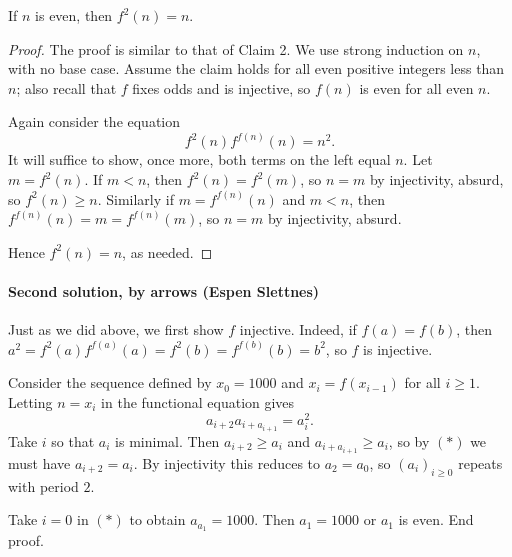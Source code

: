 \begin{claim}
    If $n$ is even, then $f^2(n)=n$.
\end{claim}
\begin{proof}
    The proof is similar to that of Claim 2. We use strong induction on $n$, with no base case. Assume the claim holds for all even positive integers less than $n$; also recall that $f$ fixes odds and is injective, so $f(n)$ is even for all even $n$.

    Again consider the equation \[f^2(n)f^{f(n)}(n)=n^2.\]
    It will suffice to show, once more, both terms on the left equal $n$. Let $m=f^2(n)$. If $m<n$, then $f^2(n)=f^2(m)$, so $n=m$ by injectivity, absurd, so $f^2(n)\ge n$. Similarly if $m=f^{f(n)}(n)$ and $m<n$, then $f^{f(n)}(n)=m=f^{f(n)}(m)$, so $n=m$ by injectivity, absurd.

    Hence $f^2(n)=n$, as needed.
\end{proof}

\paragraph{Second solution, by arrows (Espen Slettnes)} Just as we did above, we first show $f$ injective. Indeed, if $f(a)=f(b)$, then $a^2=f^2(a)f^{f(a)}(a)=f^2(b)=f^{f(b)}(b)=b^2$, so $f$ is injective.

Consider the sequence defined by $x_0=1000$ and $x_i=f(x_{i-1})$ for all $i\ge1$. Letting $n=x_i$ in the functional equation gives \[a_{i+2}a_{i+a_{i+1}}=a_i^2.\tag{$*$}\]
Take $i$ so that $a_i$ is minimal. Then $a_{i+2}\ge a_i$ and $a_{i+a_{i+1}}\ge a_i$, so by $(*)$ we must have $a_{i+2}=a_i$. By injectivity this reduces to $a_2=a_0$, so $(a_i)_{i\ge0}$ repeats with period $2$.

Take $i=0$ in $(*)$ to obtain $a_{a_1}=1000$. Then $a_1=1000$ or $a_1$ is even. End proof.


